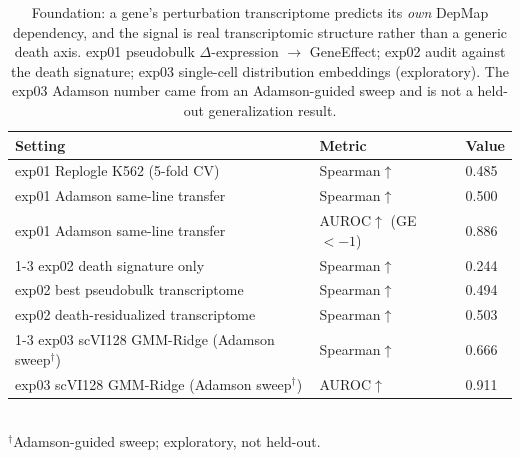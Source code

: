 \begin{table}[!htbp]
  \centering
  \caption{Foundation: a gene's perturbation transcriptome predicts its \emph{own} DepMap dependency, and the signal is real transcriptomic structure rather than a generic death axis. exp01 pseudobulk $\Delta$-expression $\to$ GeneEffect; exp02 audit against the death signature; exp03 single-cell distribution embeddings (exploratory). The exp03 Adamson number came from an Adamson-guided sweep and is not a held-out generalization result.}
  \label{tab:foundation}
  \begin{tabular}{lll}
    \toprule
    Setting & Metric & Value \\
    \midrule
    exp01 Replogle K562 (5-fold CV) & Spearman$\uparrow$ & 0.485 \\
    exp01 Adamson same-line transfer & Spearman$\uparrow$ & 0.500 \\
    exp01 Adamson same-line transfer & AUROC$\uparrow$ (GE$<-1$) & 0.886 \\
    \cmidrule(lr){1-3}
    exp02 death signature only & Spearman$\uparrow$ & 0.244 \\
    exp02 best pseudobulk transcriptome & Spearman$\uparrow$ & 0.494 \\
    exp02 death-residualized transcriptome & Spearman$\uparrow$ & 0.503 \\
    \cmidrule(lr){1-3}
    exp03 scVI128 GMM-Ridge (Adamson sweep$^\dagger$) & Spearman$\uparrow$ & 0.666 \\
    exp03 scVI128 GMM-Ridge (Adamson sweep$^\dagger$) & AUROC$\uparrow$ & 0.911 \\
    \bottomrule
  \end{tabular}
  \\[2pt] {\footnotesize $^\dagger$Adamson-guided sweep; exploratory, not held-out.}
\end{table}
